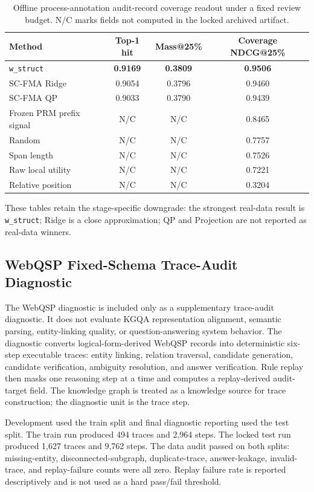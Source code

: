 \documentclass[pdflatex,sn-mathphys-num]{sn-jnl}
\begin{document}
\begin{table}[ht]
\caption{Offline process-annotation audit-record coverage readout under a fixed review budget. N/C marks fields not computed in the locked archived artifact.}
\label{tab:supp-audit-prioritization}
\centering
\small
\begin{tabular}{lccc}
\toprule
\textbf{Method} & \textbf{Top-1 hit} & \textbf{Mass@25\%} & \textbf{Coverage NDCG@25\%} \\
\midrule
\texttt{w\_struct} & \textbf{0.9169} & \textbf{0.3809} & \textbf{0.9506} \\
SC-FMA Ridge & 0.9054 & 0.3796 & 0.9460 \\
SC-FMA QP & 0.9033 & 0.3790 & 0.9439 \\
Frozen PRM prefix signal & N/C & N/C & 0.8465 \\
Random & N/C & N/C & 0.7757 \\
Span length & N/C & N/C & 0.7526 \\
Raw local utility & N/C & N/C & 0.7221 \\
Relative position & N/C & N/C & 0.3204 \\
\bottomrule
\end{tabular}
\end{table}

These tables retain the stage-specific downgrade: the strongest real-data result is \texttt{w\_struct}; Ridge is a close approximation; QP and Projection are not reported as real-data winners.

\subsection{WebQSP Fixed-Schema Trace-Audit Diagnostic}
\label{app:webqsp-trace-audit}

The WebQSP diagnostic is included only as a supplementary trace-audit diagnostic. It does not evaluate KGQA representation alignment, semantic parsing, entity-linking quality, or question-answering system behavior. The diagnostic converts logical-form-derived WebQSP records into deterministic six-step executable traces: entity linking, relation traversal, candidate generation, candidate verification, ambiguity resolution, and answer verification. Rule replay then masks one reasoning step at a time and computes a replay-derived audit-target field. The knowledge graph is treated as a knowledge source for trace construction; the diagnostic unit is the trace step.

Development used the train split and final diagnostic reporting used the test split. The train run produced 494 traces and 2,964 steps. The locked test run produced 1,627 traces and 9,762 steps. The data audit passed on both splits: missing-entity, disconnected-subgraph, duplicate-trace, answer-leakage, invalid-trace, and replay-failure counts were all zero. Replay failure rate is reported descriptively and is not used as a hard pass/fail threshold.
\end{document}
